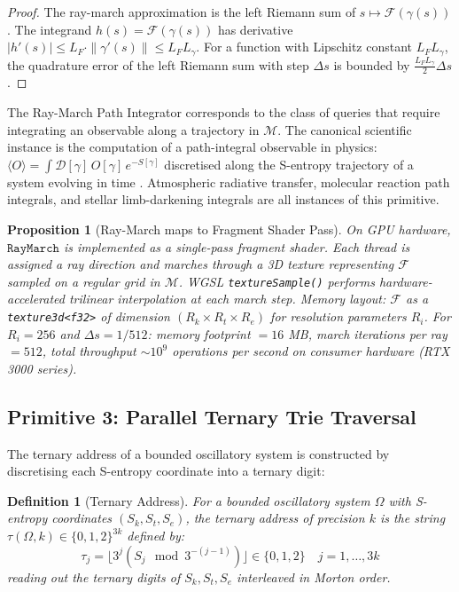 \documentclass[10pt,twocolumn]{article}
\newtheorem{proposition}[theorem]{Proposition}
\newtheorem{definition}[theorem]{Definition}
\newcommand{\ManifoldM}{\mathcal{M}}
\begin{document}
\begin{proof}
The ray-march approximation is the left Riemann sum of $s \mapsto \mathcal{F}(\gamma(s))$.
The integrand $h(s) = \mathcal{F}(\gamma(s))$ has derivative
$|h'(s)| \leq L_F \cdot \|\gamma'(s)\| \leq L_F L_\gamma$.
For a function with Lipschitz constant $L_F L_\gamma$,
the quadrature error of the left Riemann sum with step $\Delta s$ is bounded by
$\frac{L_F L_\gamma}{2} \Delta s$ \cite{rudin1987}.
\end{proof}

The Ray-March Path Integrator corresponds to the class of queries
that require integrating an observable along a trajectory in $\ManifoldM$.
The canonical scientific instance is the computation of a path-integral
observable in physics: $\langle O \rangle = \int \mathcal{D}[\gamma] \, O[\gamma] \, e^{-S[\gamma]}$
discretised along the S-entropy trajectory of a system evolving in time \cite{feynman1948}.
Atmospheric radiative transfer, molecular reaction path integrals, and
stellar limb-darkening integrals are all instances of this primitive.

\begin{proposition}[Ray-March maps to Fragment Shader Pass]
\label{prop:raymarch-shader}
On GPU hardware, $\mathtt{RayMarch}$ is implemented as a single-pass
fragment shader. Each thread is assigned a ray direction and marches
through a 3D texture representing $\mathcal{F}$ sampled on a
regular grid in $\ManifoldM$. WGSL \texttt{textureSample()} performs
hardware-accelerated trilinear interpolation at each march step.
Memory layout: $\mathcal{F}$ as a \texttt{texture3d<f32>} of dimension
$(R_k \times R_t \times R_e)$ for resolution parameters $R_i$.
For $R_i = 256$ and $\Delta s = 1/512$: memory footprint $= 16$ MB,
march iterations per ray $= 512$, total throughput $\sim 10^9$ operations per second
on consumer hardware (RTX 3000 series).
\end{proposition}

\subsection{Primitive 3: Parallel Ternary Trie Traversal}

The ternary address of a bounded oscillatory system is constructed
by discretising each S-entropy coordinate into a ternary digit:

\begin{definition}[Ternary Address]
\label{def:ternary-address}
For a bounded oscillatory system $\Omega$ with S-entropy coordinates $(S_k, S_t, S_e)$,
the \emph{ternary address} of precision $k$ is the string
$\tau(\Omega, k) \in \{0,1,2\}^{3k}$ defined by:
\begin{equation}
\tau_j = \lfloor 3^j (S_j \mod 3^{-(j-1)}) \rfloor \in \{0,1,2\}
\quad j = 1, \ldots, 3k
\label{eq:ternary-addr}
\end{equation}
reading out the ternary digits of $S_k, S_t, S_e$ interleaved in Morton order.
\end{definition}
\end{document}
